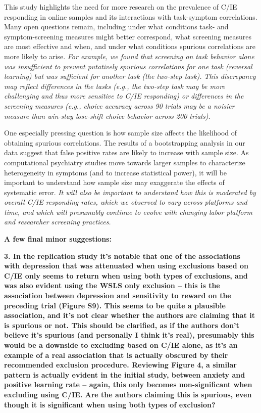 \documentclass[a4paper,notitlepage,12pt]{article}
\begin{document}
\begin{displayquote}
    This study highlights the need for more research on the prevalence of C/IE responding in online samples and its interactions with task-symptom correlations. Many open questions remain, including under what conditions task- and symptom-screening measures might better correspond, what screening measures are most effective and when, and under what conditions spurious correlations are more likely to arise. \textit{For example, we found that screening on task behavior alone was insufficient to prevent putatively spurious correlations for one task (reversal learning) but was sufficient for another task (the two-step task). This discrepancy may reflect differences in the tasks (e.g., the two-step task may be more challenging and thus more sensitive to C/IE responding) or differences in the screening measures (e.g., choice accuracy across 90 trials may be a noisier measure than win-stay lose-shift choice behavior across 200 trials).} 

    One especially pressing question is how sample size affects the likelihood of obtaining spurious correlations. The results of a bootstrapping analysis in our data suggest that false positive rates are likely to increase with sample size. As computational psychiatry studies move towards larger samples to characterize heterogeneity in symptoms (and to increase statistical power), it will be important to understand how sample size may exaggerate the effects of systematic error. \textit{It will also be important to understand how this is moderated by overall C/IE responding rates, which we observed to vary across platforms and time, and which will presumably continue to evolve with changing labor platform and researcher screening practices.}
\end{displayquote}

\textbf{A few final minor suggestions:}

\textbf{3. In the replication study it's notable that one of the associations with depression that was attenuated when using exclusions based on C/IE only seems to return when using both types of exclusions, and was also evident using the WSLS only exclusion – this is the association between depression and sensitivity to reward on the preceding trial (Figure S9). This seems to be quite a plausible association, and it's not clear whether the authors are claiming that it is spurious or not. This should be clarified, as if the authors don't believe it's spurious (and personally I think it's real), presumably this would be a downside to excluding based on C/IE alone, as it's an example of a real association that is actually obscured by their recommended exclusion procedure. Reviewing Figure 4, a similar pattern is actually evident in the initial study, between anxiety and positive learning rate – again, this only becomes non-significant when excluding using C/IE. Are the authors claiming this is spurious, even though it is significant when using both types of exclusion?}
\end{document}
